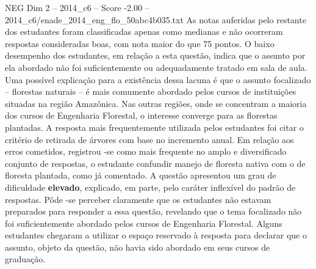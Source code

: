 \begin{textsample}{NEG Dim 2 – 2014\_c6 – Score -2.00 – 2014\_c6/enade\_2014\_eng\_flo\_50abc4b035.txt}
As notas auferidas pelo restante dos estudantes foram classificadas apenas como medianas e não ocorreram respostas consideradas boas, com nota maior do que 75 pontos.
O baixo desempenho dos estudantes, em relação a esta questão, indica que o assunto por ela abordado não foi suficientemente ou adequadamente tratado em sala de aula.
Uma possível explicação para a existência dessa lacuna é que o assunto focalizado – florestas naturais – é mais comumente abordado pelos cursos de instituições situadas na região Amazônica.
Nas outras regiões, onde se concentram a maioria dos cursos de Engenharia Florestal, o interesse converge para as florestas plantadas.
A resposta mais frequentemente utilizada pelos estudantes foi citar o critério de retirada de árvores com base no incremento anual.
Em relação aos erros cometidos, registrou -se como mais frequente no amplo e diversificado conjunto de respostas, o estudante confundir manejo de floresta nativa com o de floresta plantada, como já comentado.
A questão apresentou um grau de dificuldade \textbf{elevado}, explicado, em parte, pelo caráter inflexível do padrão de respostas.
Pôde -se perceber claramente que os estudantes não estavam preparados para responder a essa questão, revelando que o tema focalizado não foi suficientemente abordado pelos cursos de Engenharia Florestal.
Alguns estudantes chegaram a utilizar o espaço reservado à resposta para declarar que o assunto, objeto da questão, não havia sido abordado em seus cursos de graduação.

\end{textsample}
